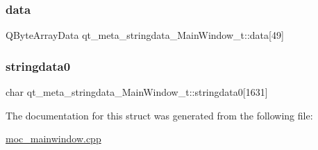 \subsubsection{\texorpdfstring{data}{data}}
{\footnotesize\ttfamily Q\+Byte\+Array\+Data qt\+\_\+meta\+\_\+stringdata\+\_\+\+Main\+Window\+\_\+t\+::data\mbox{[}49\mbox{]}}

\mbox{\label{structqt__meta__stringdata___main_window__t_a2155dbbc86834094a09943c561c7c5a7}} 
\subsubsection{\texorpdfstring{stringdata0}{stringdata0}}
{\footnotesize\ttfamily char qt\+\_\+meta\+\_\+stringdata\+\_\+\+Main\+Window\+\_\+t\+::stringdata0\mbox{[}1631\mbox{]}}



The documentation for this struct was generated from the following file\+:\begin{DoxyCompactItemize}
\item 
\hyperlink{moc__mainwindow_8cpp}{moc\+\_\+mainwindow.\+cpp}\end{DoxyCompactItemize}

